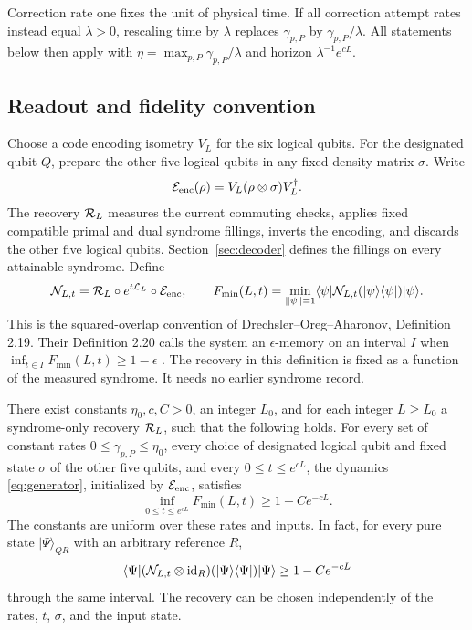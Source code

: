 Correction rate one fixes the unit of physical time. If all correction
attempt rates instead equal \(\lambda>0\), rescaling time by
\(\lambda\) replaces \(\gamma_{p,P}\) by
\(\gamma_{p,P}/\lambda\). All statements below then apply with
\(\eta=\max_{p,P}\gamma_{p,P}/\lambda\) and horizon
\(\lambda^{-1}e^{cL}\).

\subsection{Readout and fidelity convention}

Choose a code encoding isometry \(V_L\) for the six logical qubits.
For the designated qubit \(Q\), prepare the other five logical qubits
in any fixed density matrix \(\sigma\). Write
\[
 \mathcal E_{\rm enc}(\rho)=V_L(\rho\otimes\sigma)V_L^\dagger.
\]
The recovery \(\mathcal R_L\) measures the current commuting checks,
applies fixed compatible primal and dual syndrome fillings, inverts
the encoding, and discards the other five logical qubits.
Section~\ref{sec:decoder} defines the fillings on every attainable
syndrome. Define
\begin{equation}\label{eq:fidelity}
 \mathcal N_{L,t}=\mathcal R_L\circ e^{t\mathcal L_L}\circ\mathcal E_{\rm enc},\qquad
 F_{\min}(L,t)=
 \min_{\|\psi\|=1}\langle\psi|
       \mathcal N_{L,t}(|\psi\rangle\langle\psi|)|\psi\rangle.
\end{equation}
This is the squared-overlap convention of
Drechsler--Oreg--Aharonov, Definition 2.19. Their Definition 2.20 calls
the system an \(\epsilon\)-memory on an interval \(I\) when
\(\inf_{t\in I}F_{\min}(L,t)\ge1-\epsilon\) \cite{DOA}.
The recovery in this definition is fixed as a function of the measured
syndrome. It needs no earlier syndrome record.

\begin{theorem}\label{thm:main}
There exist constants \(\eta_0,c,C>0\), an integer \(L_0\), and for
each integer \(L\ge L_0\) a syndrome-only recovery \(\mathcal R_L\), such
that the following holds. For every set of constant rates
\(0\le\gamma_{p,P}\le\eta_0\), every choice of designated logical qubit
and fixed state \(\sigma\) of the other five qubits, and every
\(0\le t\le e^{cL}\), the dynamics \eqref{eq:generator}, initialized
by \(\mathcal E_{\rm enc}\), satisfies
\begin{equation}\label{eq:main}
 \inf_{0\le t\le e^{cL}}F_{\min}(L,t)\ge1-Ce^{-cL}.
\end{equation}
The constants are uniform over these rates and inputs. In fact, for
every pure state \(|\Psi\rangle_{QR}\) with an arbitrary reference \(R\),
\[
 \langle\Psi|(\mathcal N_{L,t}\otimes\operatorname{id}_R)
          (|\Psi\rangle\langle\Psi|)|\Psi\rangle
 \ge1-Ce^{-cL}
\]
through the same interval. The recovery can be chosen independently
of the rates, \(t\), \(\sigma\), and the input state.
\end{theorem}

